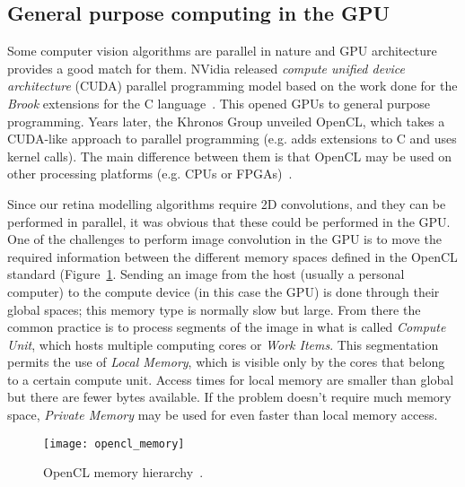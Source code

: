 

\subsection{General purpose computing in the GPU}

Some computer vision algorithms are parallel in nature and GPU architecture provides a good match for them. NVidia released \emph{compute unified device architecture} (CUDA) parallel programming model based on the work done for the \emph{Brook} extensions for the C language~\cite{buck2004brook,cuda}. This opened GPUs to general purpose programming. Years later, the Khronos Group unveiled OpenCL, which takes a CUDA-like approach to parallel programming (e.g. adds extensions to C and uses kernel calls). The main difference between them is that OpenCL may be used on other processing platforms (e.g. CPUs or FPGAs)~\cite{opencl}.

Since our retina modelling algorithms require 2D convolutions, and they can be performed in parallel, it was obvious that these could be performed in the GPU. One of the challenges to perform image convolution in the GPU is to move the required information between the different memory spaces defined in the OpenCL standard (Figure~\ref{fig:c2s:opencl-mem}. Sending an image from the host (usually a personal computer) to the compute device (in this case the GPU) is done through their global spaces; this memory type is normally slow but large. From there the common practice is to process segments of the image in what is called \emph{Compute Unit}, which hosts multiple computing cores or \emph{Work Items}. This segmentation permits the use of \emph{Local Memory}, which is visible only by the cores that belong to a certain compute unit. Access times for local memory are smaller than global but there are fewer bytes available. If the problem doesn't require much memory space, \emph{Private Memory} may be used for even faster than local memory access.

\begin{figure}[h]
  \begin{center}
    \texttt{[image: opencl\_memory]}
    \caption{OpenCL memory hierarchy~\cite{opencl}.}
    \label{fig:c2s:opencl-mem}
  \end{center}
\end{figure}

